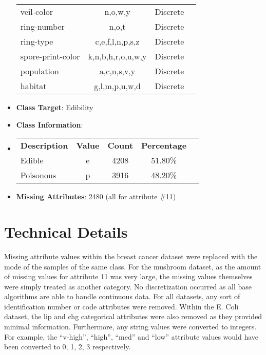 \documentclass[11pt]{article}
\newcommand{\bb}{\textbf}
\begin{document}
\begin{itemize}[leftmargin=*]
\begin{tabular}{l c c c }
    veil-color               & n,o,w,y                 & Discrete  \\
    ring-number              & n,o,t                   & Discrete  \\
    ring-type                & c,e,f,l,n,p,s,z         & Discrete  \\
    spore-print-color        & k,n,b,h,r,o,u,w,y       & Discrete  \\
    population               & a,c,n,s,v,y             & Discrete  \\
    habitat                  & g,l,m,p,u,w,d           & Discrete
  \end{tabular}
  \item[] \bb{Class Target}: Edibility
  \item[] \bb{Class Information}:
  \item[]
  \begin{tabular}{l c c c c }
    \bb{Description} & \bb{Value} & \bb{Count} & \bb{Percentage} \\
    Edible           & e          & 4208       & 51.80\%        \\
    Poisonous        & p          & 3916       & 48.20\%
  \end{tabular}
  \item[] \bb{Missing Attributes}: 2480 (all for attribute \#11)
\end{itemize}

\section{Technical Details}
Missing attribute values within the breast cancer dataset were replaced with the mode of the samples of the same class. For the mushroom dataset, as the amount of missing values for attribute 11 was very large, the missing values themselves were simply treated as another category. No discretization occurred as all base algorithms are able to handle continuous data. For all datasets, any sort of identification number or code attributes were removed. Within the E. Coli dataset, the lip and chg categorical attributes were also removed as they provided minimal information. Furthermore, any string values were converted to integers. For example, the ``v-high'', ``high'', ``med'' and ``low'' attribute values would have been converted to 0, 1, 2, 3 respectively.
\end{document}
